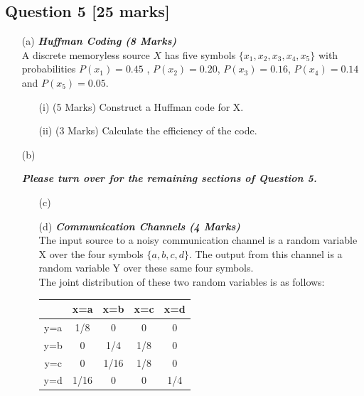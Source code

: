 \documentclass[a4paper,12pt]{article}
\begin{document}
\subsection*{Question 5 [25 marks] }
\begin{itemize}
\item[(a)] \textbf{\textit{Huffman Coding (8 Marks)}}\\
A discrete memoryless source $X$ has five symbols $\{x_1,x_2,x_3,x_4,x_5\}$ with probabilities $P(x_1) = 0.45$ , $P(x_2) = 0.20$, $P(x_3) = 0.16$, $P(x_4) = 0.14$ and $P(x_5) = 0.05$.

\begin{itemize}
\item[(i)] (5 Marks) Construct a Huffman code for X.
\item[(ii)] (3 Marks) Calculate the efficiency of the code.
\end{itemize}
\bigskip
\item[(b)] 

{
\normalsize
\textit{\textbf{Please turn over for the remaining sections of Question 5.}}
}

\newpage
\begin{itemize}
\item[(c)]


\item[(d)] \textbf{\textit{Communication Channels (4 Marks)}}\\
The input source to a noisy communication channel is a random variable X over the
four symbols $\{a, b, c, d\}$. The output from this channel is a random variable Y over these same
four symbols. \\
\vspace{0.3cm}
\noindent 
The joint distribution of these two random variables is as follows:\\ \bigskip

\begin{center}
\begin{tabular}{|c|c|c|c|c|}
\hline
&x=a& x=b & x=c & x=d \\ \hline
y=a &1/8 &0 &0 & 0 \\ \hline
y=b &0 & 1/4& 1/8& 0 \\ \hline
y=c & 0&1/16 & 1/8 & 0\\ \hline
y=d & 1/16& 0& 0 & 1/4\\ \hline
\end{tabular}
\end{center}


\end{itemize}
\end{itemize}
\end{document}

